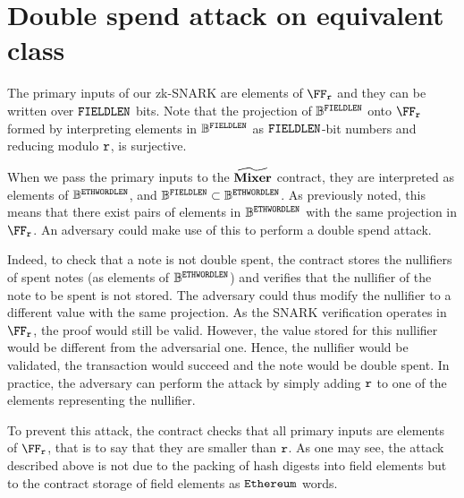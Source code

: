 \chapter{Double spend attack on equivalent class}\label{appendix:dbspd}

The primary inputs of our zk-SNARK are elements of $\FFx{\rCURVE}$ and they can be written over $\mathtt{FIELDLEN}$ bits. Note that the projection of $\mathbb{B}^{\mathtt{FIELDLEN}}$ onto $\FFx{\rCURVE}$ formed by interpreting elements in $\mathbb{B}^{\mathtt{FIELDLEN}}$ as $\mathtt{FIELDLEN}$-bit numbers and reducing modulo $\mathtt{r}$, is surjective.

When we pass the primary inputs to the $\widetilde{\mathbf{Mixer}}$ contract, they are interpreted as elements of $\mathbb{B}^{\mathtt{ETHWORDLEN}}$, and $\mathbb{B}^{\mathtt{FIELDLEN}} \subset \mathbb{B}^{\mathtt{ETHWORDLEN}}$. As previously noted, this means that there exist pairs of elements in $\mathbb{B}^{\mathtt{ETHWORDLEN}}$ with the same projection in $\FFx{\rCURVE}$. An adversary could make use of this to perform a double spend attack.

Indeed, to check that a note is not double spent, the contract stores the nullifiers of spent notes (as elements of $\mathbb{B}^{\mathtt{ETHWORDLEN}}$) and verifies that the nullifier of the note to be spent is not stored. The adversary could thus modify the nullifier to a different value with the same projection. As the SNARK verification operates in $\FFx{\rCURVE}$, the proof would still be valid. However, the value stored for this nullifier would be different from the adversarial one. Hence, the nullifier would be validated, the transaction would succeed and the note would be double spent.
In practice, the adversary can perform the attack by simply adding $\mathtt{r}$ to one of the elements representing the nullifier.

To prevent this attack, the contract checks that all primary inputs are elements of $\FFx{\rCURVE}$, that is to say that they are smaller than $\mathtt{r}$.
As one may see, the attack described above is not due to the packing of hash digests into field elements but to the contract storage of field elements as $\texttt{Ethereum}$ words.
